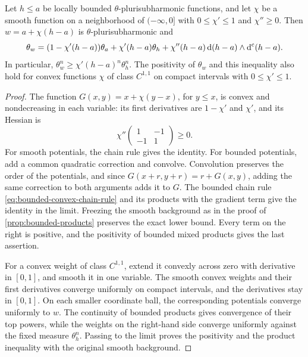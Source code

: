 \begin{lemma}\label{lem:bounded-convex-pair}
Let $h\leq a$ be locally bounded $\theta$-plurisubharmonic functions, and let $\chi$ be a smooth function on a neighborhood of $(-\infty,0]$ with $0\leq\chi'\leq1$ and $\chi''\geq0$. Then $w=a+\chi(h-a)$ is $\theta$-plurisubharmonic and
\[
 \theta_w=(1-\chi'(h-a))\theta_a+\chi'(h-a)\theta_h
       +\chi''(h-a)\,\mathrm{d}(h-a)\wedge\mathrm d^{\mathrm c}(h-a).
\]
In particular, $\theta_w^n\geq\chi'(h-a)^n\theta_h^n$. The positivity of $\theta_w$ and this inequality also hold for convex functions $\chi$ of class $C^{1,1}$ on compact intervals with $0\leq\chi'\leq1$.
\end{lemma}
\begin{proof}
The function $G(x,y)=x+\chi(y-x)$, for $y\leq x$, is convex and nondecreasing in each variable: its first derivatives are $1-\chi'$ and $\chi'$, and its Hessian is
\[
 \chi''\begin{pmatrix}1&-1\\-1&1\end{pmatrix}\geq0.
\]
For smooth potentials, the chain rule gives the identity. For bounded potentials, add a common quadratic correction and convolve. Convolution preserves the order of the potentials, and since $G(x+r,y+r)=r+G(x,y)$, adding the same correction to both arguments adds it to $G$. The bounded chain rule \eqref{eq:bounded-convex-chain-rule} and its products with the gradient term give the identity in the limit. Freezing the smooth background as in the proof of \cref{prop:bounded-products} preserves the exact lower bound. Every term on the right is positive, and the positivity of bounded mixed products gives the last assertion.

For a convex weight of class $C^{1,1}$, extend it convexly across zero with derivative in $[0,1]$, and smooth it in one variable. The smooth convex weights and their first derivatives converge uniformly on compact intervals, and the derivatives stay in $[0,1]$. On each smaller coordinate ball, the corresponding potentials converge uniformly to $w$. The continuity of bounded products gives convergence of their top powers, while the weights on the right-hand side converge uniformly against the fixed measure $\theta_h^n$. Passing to the limit proves the positivity and the product inequality with the original smooth background.
\end{proof}
